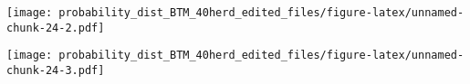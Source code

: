 \documentclass[]{article}
\newenvironment{Shaded}{\begin{snugshade}}{\end{snugshade}}
\newcommand{\KeywordTok}[1]{\textcolor[rgb]{0.13,0.29,0.53}{\textbf{#1}}}
\newcommand{\OperatorTok}[1]{\textcolor[rgb]{0.81,0.36,0.00}{\textbf{#1}}}
\newcommand{\NormalTok}[1]{#1}
\begin{document}
\texttt{[image: probability\_dist\_BTM\_40herd\_edited\_files/figure-latex/unnamed-chunk-24-2.pdf]}

\begin{Shaded}
\end{Shaded}

\texttt{[image: probability\_dist\_BTM\_40herd\_edited\_files/figure-latex/unnamed-chunk-24-3.pdf]}
\end{document}
